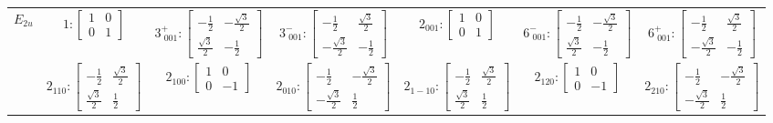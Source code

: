 \documentclass[fleqn,8pt,landscape]{jsarticle}
\begin{document}
\begin{longtable}{ccccccc}
$ E_{2u} $ & $ 1:\begin{bmatrix} 1 & 0 \\ 0 & 1 \end{bmatrix} $ & $ 3^{+}_{\,\,001}:\begin{bmatrix} - \frac{1}{2} & - \frac{\sqrt{3}}{2} \\ \frac{\sqrt{3}}{2} & - \frac{1}{2} \end{bmatrix} $ & $ 3^{-}_{\,\,001}:\begin{bmatrix} - \frac{1}{2} & \frac{\sqrt{3}}{2} \\ - \frac{\sqrt{3}}{2} & - \frac{1}{2} \end{bmatrix} $ & $ 2{}_{001}:\begin{bmatrix} 1 & 0 \\ 0 & 1 \end{bmatrix} $ & $ 6^{-}_{\,\,001}:\begin{bmatrix} - \frac{1}{2} & - \frac{\sqrt{3}}{2} \\ \frac{\sqrt{3}}{2} & - \frac{1}{2} \end{bmatrix} $ & $ 6^{+}_{\,\,001}:\begin{bmatrix} - \frac{1}{2} & \frac{\sqrt{3}}{2} \\ - \frac{\sqrt{3}}{2} & - \frac{1}{2} \end{bmatrix} $ \\
& $ 2{}_{110}:\begin{bmatrix} - \frac{1}{2} & \frac{\sqrt{3}}{2} \\ \frac{\sqrt{3}}{2} & \frac{1}{2} \end{bmatrix} $ & $ 2{}_{100}:\begin{bmatrix} 1 & 0 \\ 0 & -1 \end{bmatrix} $ & $ 2{}_{010}:\begin{bmatrix} - \frac{1}{2} & - \frac{\sqrt{3}}{2} \\ - \frac{\sqrt{3}}{2} & \frac{1}{2} \end{bmatrix} $ & $ 2{}_{1-10}:\begin{bmatrix} - \frac{1}{2} & \frac{\sqrt{3}}{2} \\ \frac{\sqrt{3}}{2} & \frac{1}{2} \end{bmatrix} $ & $ 2{}_{120}:\begin{bmatrix} 1 & 0 \\ 0 & -1 \end{bmatrix} $ & $ 2{}_{210}:\begin{bmatrix} - \frac{1}{2} & - \frac{\sqrt{3}}{2} \\ - \frac{\sqrt{3}}{2} & \frac{1}{2} \end{bmatrix} $ \\

\end{longtable}
\end{document}
